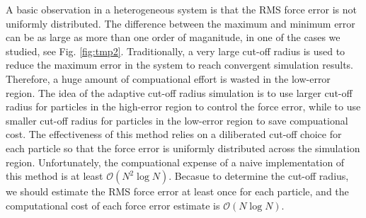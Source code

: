 \documentclass[aps,pre,preprint]{revtex4}
\begin{document}

A basic observation in a heterogeneous system is that the RMS force
error is not uniformly distributed. The difference between the maximum
and minimum error can be as large as more than one order of
maganitude, in one of the cases we studied, see
Fig. \ref{fig:tmp2}. Traditionally, a very large cut-off radius is
used to reduce the maximum error in the system to reach convergent
simulation results. Therefore, a huge amount of compuational effort is
wasted in the low-error region. The idea of the adaptive cut-off
radius simulation is to use larger cut-off radius for particles in the
high-error region to control the force error, while to use smaller
cut-off radius for particles in the low-error region to save
compuational cost.  The effectiveness of this method relies on a
diliberated cut-off choice for each particle so that the force error
is uniformly distributed across the simulation region.  Unfortunately,
the compuational expense of a naive implementation of this method is
at least $\mathcal O(N^2\log N)$.  Becasue to determine the cut-off
radius, we should estimate the RMS force error at least once for each
particle, and the computational cost of each force error estimate is
$\mathcal O(N \log N)$.


\end{document}
